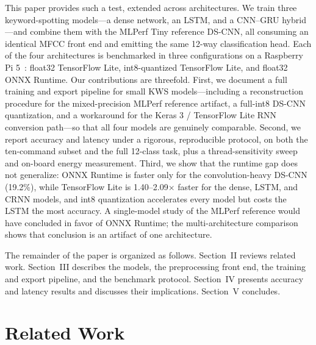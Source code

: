 \documentclass[conference,a4paper]{IEEEtran}
\begin{document}
This paper provides such a test, extended across architectures. We train three keyword-spotting models---a dense network, an LSTM, and a CNN--GRU hybrid---and combine them with the MLPerf Tiny reference DS-CNN, all consuming an identical MFCC front end and emitting the same 12-way classification head. Each of the four architectures is benchmarked in three configurations on a Raspberry Pi 5~\cite{raspberrypi5}: float32 TensorFlow Lite, int8-quantized TensorFlow Lite, and float32 ONNX Runtime. Our contributions are threefold. First, we document a full training and export pipeline for small KWS models---including a reconstruction procedure for the mixed-precision MLPerf reference artifact, a full-int8 DS-CNN quantization, and a workaround for the Keras 3 / TensorFlow Lite RNN conversion path---so that all four models are genuinely comparable. Second, we report accuracy and latency under a rigorous, reproducible protocol, on both the ten-command subset and the full 12-class task, plus a thread-sensitivity sweep and on-board energy measurement. Third, we show that the runtime gap does not generalize: ONNX Runtime is faster only for the convolution-heavy DS-CNN (19.2\%), while TensorFlow Lite is 1.40--2.09$\times$ faster for the dense, LSTM, and CRNN models, and int8 quantization accelerates every model but costs the LSTM the most accuracy. A single-model study of the MLPerf reference would have concluded in favor of ONNX Runtime; the multi-architecture comparison shows that conclusion is an artifact of one architecture.

The remainder of the paper is organized as follows. Section~II reviews related work. Section~III describes the models, the preprocessing front end, the training and export pipeline, and the benchmark protocol. Section~IV presents accuracy and latency results and discusses their implications. Section~V concludes.

\section{Related Work}
\end{document}
